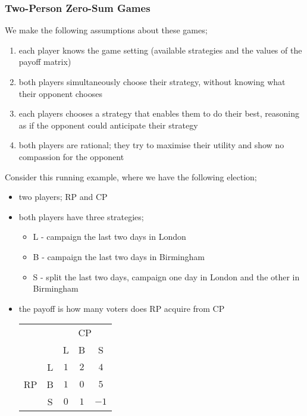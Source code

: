 \documentclass[a4paper, 12pt]{article}
\begin{document}
            \subsubsection*{Two-Person Zero-Sum Games}
                We make the following assumptions about these games;
                \begin{enumerate}[1.]
                    \itemsep0em
                    \item each player knows the game setting (available strategies and the values of the payoff matrix)
                    \item both players simultaneously choose their strategy, without knowing what their opponent chooses
                    \item each players chooses a strategy that enables them to do their best, reasoning as if the opponent could anticipate their strategy
                    \item both players are rational; they try to maximise their utility and show no compassion for the opponent
                \end{enumerate}
                Consider this running example, where we have the following election;
                \begin{itemize}
                    \itemsep0em
                    \item two players; RP and CP
                    \item both players have three strategies;
                        \begin{itemize}
                            \itemsep0em
                            \item L - campaign the last two days in London
                            \item B - campaign the last two days in Birmingham
                            \item S - split the last two days, campaign one day in London and the other in Birmingham
                        \end{itemize}
                    \item the payoff is how many voters does RP acquire from CP
                        \begin{center}
                            \begin{tabular}{|cc|ccc|}
                                \hline
                                & & \multicolumn{3}{c|}{CP} \\
                                & & L & B & S \\
                                \hline
                                \multirow{3}{*}{RP} & L & $1$ & $2$ & $4$ \\
                                & B & $1$ & $0$ & $5$ \\
                                & S & $0$ & $1$ & $-1$ \\
                                \hline
                            \end{tabular}
                        \end{center}
                \end{itemize}
\end{document}
